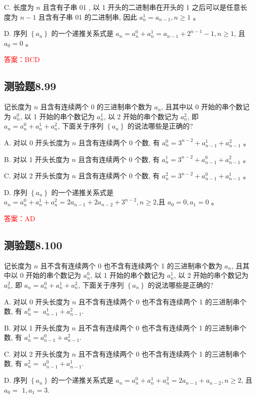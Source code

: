 \documentclass[UTF8, heading=true]{ctexart}
\begin{document}
C. 
长度为 $n$ 且含有子串 01 , 以 1 开头的二进制串在开头的 1 之后可以是任意长度为 $n-1$ 且含有子串 01 的二进制串, 因此 $a_n^1=a_{n-1}, n \geq 1$ 。

D. 
序列 $\left\{a_n\right\}$ 的一个递推关系式是 $a_n=a_n^0+a_n^1=a_{n-1}+2^{n-1}-1, n \geq 1$, 且 $a_0=0$ 。

\textcolor{red}{答案：BCD}


\subsection{测验题8.99}

记长度为 $n$ 且含有连续两个 0 的三进制串个数为 $a_n$, 且其中以 0 开始的串个数记为 $a_n^0$, 以 1 开始的串个数记为 $a_n^1$, 以 2 开始的串个数记为 $a_n^2$, 即 $a_n=a_n^0+a_n^1+a_n^2$, 下面关于序列 $\left\{a_n\right\}$ 的说法哪些是正确的?

A. 对以 0 开头长度为 $n$ 且含有连续两个 0 个数, 有 $a_n^0=3^{n-2}+a_{n-1}^1+a_{n-1}^2$ 。

B. 对以 1 开头长度为 $n$ 且含有连续两个 0 个数, 有 $a_n^1=3^{n-2}+a_{n-1}^0+a_{n-1}^2$ 。

C. 对以 2 开头长度为 $n$ 且含有连续两个 0 个数, 有 $a_n^2=3^{n-2}+a_{n-1}^0+a_{n-1}^1$ 。

D. 序列 $\left\{a_n\right\}$ 的一个递推关系式是 $a_n=a_n^0+a_n^1+a_n^2=2 a_{n-1}+2 a_{n-2}+3^{n-2}, n \geq 2$,且 $a_0=0, a_1=0$ 。


\textcolor{red}{答案：AD}

\subsection{测验题8.100}

记长度为 $n$ 且不含有连续两个 0 也不含有连续两个 1 的三进制串个数为 $a_n$, 且其中以 0 开始的串个数记为 $a_n^0$, 以 1 开始的串个数记为 $a_n^1$, 以 2 开始的串个数记为 $a_n^2$, 即 $a_n=a_n^0+a_n^1+a_n^2$, 下面关于序列 $\left\{a_n\right\}$ 的说法哪些是正确的?

A. 
对以 0 开头长度为 $n$ 且不含有连续两个 0 也不含有连续两个 1 的三进制串个数, 有 $a_n^0=$ $a_{n-1}^1+a_{n-1}^2$.

B. 对以 1 开头长度为 $n$ 且不含有连续两个 0 也不含有连续两个 1 的三进制串个数, 有 $a_n^1=a_{n-1}^0+a_{n-1}^2$.

C. 对以 2 开头长度为 $n$ 且不含有连续两个 0 也不含有连续两个 1 的三进制串个数, 有 $a_n^2=$ $a_{n-1}^0+a_{n-1}^1$.

D. 序列 $\left\{a_n\right\}$ 的一个递推关系式是 $a_n=a_n^0+a_n^1+a_n^2=2 a_{n-1}+a_{n-2}, n \geq 2$, 且 $a_0=$ $1, a_1=3$.
\end{document}
